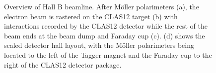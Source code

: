 \begin{figure}[ht]
\begin{minipage}[b]{\linewidth}
        \end{minipage}
        \caption[Hall B Beamline]{Overview of Hall B beamline. After M\"oller polarimeters (a), the electron beam is rastered on the CLAS12 target (b) with interactions recorded by the CLAS12 detector while the rest of the beam ends at the beam dump and Faraday cup (c). (d) shows the scaled detector hall layout, with the M\"oller polarimeters being located to the left of the Tagger magnet and the Faraday cup to the right of the CLAS12 detector package.}
        \label{fig:allfigures}
    \end{figure}

    \clearpage
